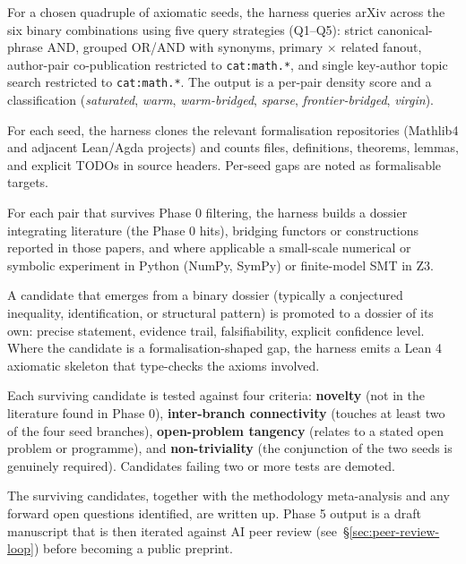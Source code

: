 \documentclass[11pt]{article}
\theoremstyle{definition}
\theoremstyle{remark}
\begin{document}
\begin{description}[style=nextline,leftmargin=1.5em]
\item[Phase 0 --- Bibliometric mapping.]
For a chosen quadruple of axiomatic seeds, the harness queries
arXiv across the six binary combinations using five query strategies
(Q1--Q5): strict canonical-phrase AND, grouped OR/AND with synonyms,
primary $\times$ related fanout, author-pair co-publication restricted to
\texttt{cat:math.*}, and single key-author topic search restricted to
\texttt{cat:math.*}. The output is a per-pair density score and a
classification (\emph{saturated}, \emph{warm}, \emph{warm-bridged},
\emph{sparse}, \emph{frontier-bridged}, \emph{virgin}).

\item[Phase 1 --- Formal-state inventory.]
For each seed, the harness clones the relevant formalisation
repositories (Mathlib4 and adjacent Lean/Agda projects) and counts files,
definitions, theorems, lemmas, and explicit TODOs in source headers.
Per-seed gaps are noted as formalisable targets.

\item[Phase 2 --- Binary-combination dossiers.]
For each pair that survives Phase 0 filtering, the harness builds a
dossier integrating literature (the Phase 0 hits), bridging functors or
constructions reported in those papers, and where applicable a
small-scale numerical or symbolic experiment in Python (NumPy, SymPy) or
finite-model SMT in Z3.

\item[Phase 3 --- Deep dives on surviving candidates.]
A candidate that emerges from a binary dossier (typically a conjectured
inequality, identification, or structural pattern) is promoted to a
dossier of its own: precise statement, evidence trail, falsifiability,
explicit confidence level. Where the candidate is a formalisation-shaped
gap, the harness emits a Lean 4 axiomatic skeleton that type-checks the
axioms involved.

\item[Phase 4 --- Filtering against the four relevance tests.]
Each surviving candidate is tested against four criteria:
\textbf{novelty} (not in the literature found in Phase 0),
\textbf{inter-branch connectivity} (touches at least two of the four
seed branches), \textbf{open-problem tangency} (relates to a stated open
problem or programme), and \textbf{non-triviality} (the conjunction of
the two seeds is genuinely required). Candidates failing two or more
tests are demoted.

\item[Phase 5 --- Synthesis and reporting.]
The surviving candidates, together with the methodology meta-analysis
and any forward open questions identified, are written up. Phase 5
output is a draft manuscript that is then iterated against AI peer
review (see~\S\ref{sec:peer-review-loop}) before becoming a public
preprint.
\end{description}
\end{document}
